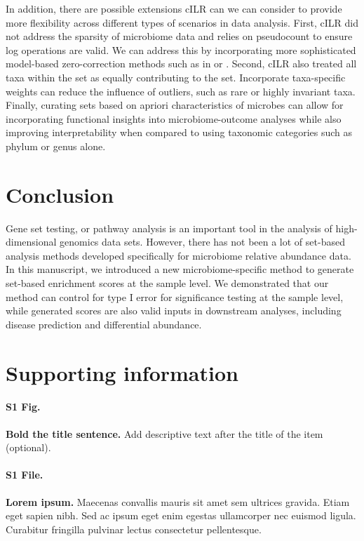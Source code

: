 \documentclass[10pt,letterpaper]{article}
\begin{document}
In addition, there are possible extensions cILR can we can consider to provide more flexibility across different types of scenarios in data analysis. First, cILR did not address the sparsity of microbiome data and relies on pseudocount to ensure log operations are valid. We can address this by incorporating more sophisticated model-based zero-correction methods such as in \cite{martin-fernandez2012} or \cite{kaul2017a}. Second, cILR also treated all taxa within the set as equally contributing to the set. Incorporate taxa-specific weights can reduce the influence of outliers, such as rare or highly invariant taxa. Finally, curating sets based on apriori characteristics of microbes can allow for incorporating functional insights into microbiome-outcome analyses while also improving interpretability when compared to using taxonomic categories such as phylum or genus alone.  

\section*{Conclusion}
Gene set testing, or pathway analysis is an important tool in the analysis of high-dimensional genomics data sets. However, there has not been a lot of set-based analysis methods developed specifically for microbiome relative abundance data. In this manuscript, we introduced a new microbiome-specific method to generate set-based enrichment scores at the sample level. We demonstrated that our method can control for type I error for significance testing at the sample level, while generated scores are also valid inputs in downstream analyses, including disease prediction and differential abundance.  


\section*{Supporting information}

\paragraph*{S1 Fig.}
\label{S1_Fig}
{\bf Bold the title sentence.} Add descriptive text after the title of the item (optional).

\paragraph*{S1 File.}
\label{S1_File}
{\bf Lorem ipsum.}  Maecenas convallis mauris sit amet sem ultrices gravida. Etiam eget sapien nibh. Sed ac ipsum eget enim egestas ullamcorper nec euismod ligula. Curabitur fringilla pulvinar lectus consectetur pellentesque.
\end{document}
